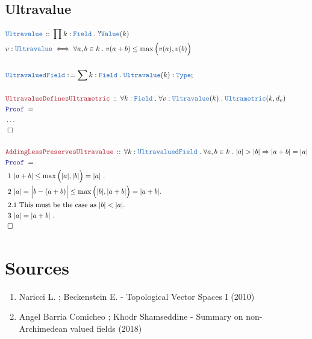 \documentclass[12pt]{scrartcl}
\newcommand{\TYPE}[1]{\textcolor{NavyBlue}{\mathtt{#1}}}
\newcommand{\LOGIC}[1]{\textcolor{Blue}{\mathtt{#1}}}
\newcommand{\THM}[1]{\textcolor{Maroon}{\mathtt{#1}}}
\renewcommand{\.}{\; . \;}
\newcommand{\de}{: \kern 0.1pc =}
\newcommand{\Theorem}[2]{& \THM{#1} \, :: \, #2 \\ & \Proof = \\ }
\newcommand{\DeclareType}[2]{& \TYPE{#1} \, :: \, #2 \\}
\newcommand{\DefineType}[3]{& #1 : \TYPE{#2} \iff #3 \\}
\newcommand{\Page}[1]{ \begin{align*} #1 \end{align*}   }
\newcommand{\NoProof}{ & \ldots \\ \EndProof}
\newcommand{\Explain}[1]{& \text{#1.} \\}
\newcommand{\Imply}{\Rightarrow}
\newcommand{\Type}{\TYPE{Type}}
\newcommand{\Conclude}[3]{& #1 \de #2 : #3; \\}
\newcommand{\QED}{\; \square}
\newcommand{\EndProof}{& \QED \\}
\newcommand{\Proof}{\LOGIC{Proof} \; }
\newcommand{\Field}{\TYPE{Field}}
\begin{document}
\subsection{Ultravalue}
\Page{
	\DeclareType{Ultravalue}
	{
		\prod k : \Field \. ?\TYPE{Value}(k)
	}
	\DefineType{v}{Ultravalue}{\forall a,b \in k \. v(a+b) \le \max\Big(v(a),v(b)\Big)} 
	\\
	\Conclude{\TYPE{UltravaluedField}}
	{\sum  k : \Field \. \TYPE{Ultravalue}(k)}{\Type}
	\\
	\Theorem{UltravalueDefinesUltrametric}
	{
		\forall k : \Field \.
		\forall v : \TYPE{Ultravalue}(k) \.
		\TYPE{Ultrametric}(k,d_v)
	}
	\NoProof
	\\
	\Theorem{AddingLessPreservesUltravalue}
	{
		\forall k :\TYPE{UltravaluedField} \.
		\forall a,b \in k \.
		|a| > |b| \Imply |a + b| = |a|
	} 
	\Explain{ 1
		$|a + b| \le \max\Big(|a|,|b|\Big) = |a|$
	}   
	\Explain{ 2
		$ |a| = \Big|b  - (a + b) \Big| \le \max\Big( |b|, |a+b| \Big) = |a + b|$}
	\Explain{ 2.1
		This must be the case as $|b| < |a|$}
	\Explain{ 3
		$|a| = |a + b|$	
	}
	\EndProof
}
\newpage
\section*{Sources}
\begin{enumerate}
\item Naricci L. ; Beckenstein E. - Topological Vector Spaces I (2010)
\item Angel Barria Comicheo ; Khodr Shamseddine - Summary on non-Archimedean valued fields (2018)
\end{enumerate}
\end{document}
